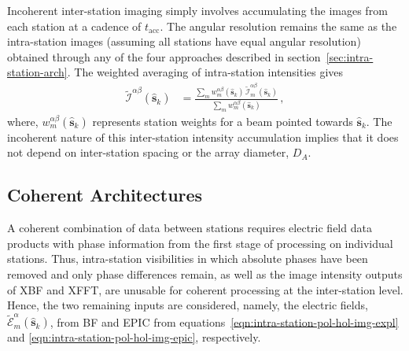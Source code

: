 \documentclass[
  journal=pasa,
  manuscript=article-type,
  year=2020,
  volume=37,
]{cup-journal}
\begin{document}
Incoherent inter-station imaging simply involves accumulating the images from each station at a cadence of $t_\textrm{acc}$. The angular resolution remains the same as the intra-station images (assuming all stations have equal angular resolution) obtained through any of the four approaches described in section~\ref{sec:intra-station-arch}. The weighted averaging of intra-station intensities gives 
\begin{align}
    \widetilde{\mathcal{I}}^{\alpha\beta}(\hat{\boldsymbol{s}}_k) &= \frac{\sum_m w_{m}^{\alpha\beta}(\hat{\boldsymbol{s}}_k) \, \widetilde{\mathcal{I}}_m^{\alpha\beta}(\hat{\boldsymbol{s}}_k)}{\sum_m w_{m}^{\alpha\beta}(\hat{\boldsymbol{s}}_k)} \, , \label{eqn:inter-station-incoherent-pol-images}
\end{align}
where, $w_{m}^{\alpha\beta}(\hat{\boldsymbol{s}}_k)$ represents station weights for a beam pointed towards $\hat{\boldsymbol{s}}_k$. The incoherent nature of this inter-station intensity accumulation implies that it does not depend on inter-station spacing or the array diameter, $D_A$. 

\subsection{Coherent Architectures} \label{sec:coherent}

A coherent combination of data between stations requires electric field data products with phase information from the first stage of processing on individual stations. Thus, intra-station visibilities in which absolute phases have been removed and only phase differences remain, as well as the image intensity outputs of XBF and XFFT, are unusable for coherent processing at the inter-station level. Hence, the two remaining inputs are considered, namely, the electric fields, $\widetilde{\mathcal{E}}_m^\alpha(\hat{\boldsymbol{s}}_k)$, from BF and EPIC from equations~\ref{eqn:intra-station-pol-hol-img-expl} and \ref{eqn:intra-station-pol-hol-img-epic},
respectively. 
\end{document}
